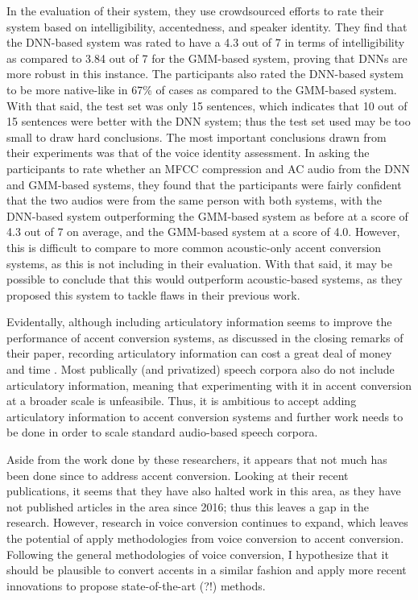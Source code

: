 \documentclass
[
    a4paper,
    twoside,
    12pt
]
{report}
\begin{document}
In the evaluation of their system, they use crowdsourced efforts to rate
their system based on intelligibility, accentedness, and speaker
identity. They find that the DNN-based system was rated to have a 4.3
out of 7 in terms of intelligibility as compared to 3.84 out of 7 for
the GMM-based system, proving that DNNs are more robust in this
instance. The participants also rated the DNN-based system to be more
native-like in 67\% of cases as compared to the GMM-based system. With
that said, the test set was only 15 sentences, which indicates that 10
out of 15 sentences were better with the DNN system; thus the test set
used may be too small to draw hard conclusions. The most important
conclusions drawn from their experiments was that of the voice identity
assessment. In asking the participants to rate whether an MFCC
compression and AC audio from the DNN and GMM-based systems, they found
that the participants were fairly confident that the two audios were
from the same person with both systems, with the DNN-based system
outperforming the GMM-based system as before at a score of 4.3 out of 7
on average, and the GMM-based system at a score of 4.0. However, this is
difficult to compare to more common acoustic-only accent conversion
systems, as this is not including in their evaluation. With that said,
it may be possible to conclude that this would outperform acoustic-based
systems, as they proposed this system to tackle flaws in their previous
work.

Evidentally, although including articulatory information seems to
improve the performance of accent conversion systems, as discussed in
the closing remarks of their paper, recording articulatory information
can cost a great deal of money and time \parencite{aryal2015}. Most
publically (and privatized) speech corpora also do not include
articulatory information, meaning that experimenting with it in accent
conversion at a broader scale is unfeasibile. Thus, it is ambitious to
accept adding articulatory information to accent conversion systems and
further work needs to be done in order to scale standard audio-based
speech corpora.

Aside from the work done by these researchers, it appears that not much
has been done since to address accent conversion. Looking at their
recent publications, it seems that they have also halted work in this
area, as they have not published articles in the area since 2016; thus
this leaves a gap in the research. However, research in voice conversion
continues to expand, which leaves the potential of apply methodologies
from voice conversion to accent conversion. Following the general
methodologies of voice conversion, I hypothesize that it should be
plausible to convert accents in a similar fashion and apply more recent
innovations to propose state-of-the-art (?!) methods.
\cleardoublepage
\end{document}
